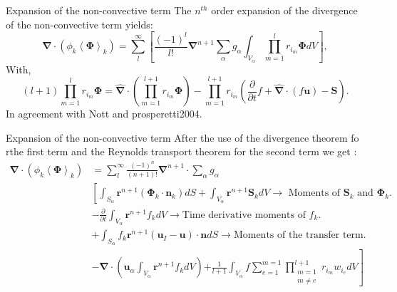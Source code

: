 \documentclass{sintefbeamer}
\newcommand{\kavg}[1]{\left<#1\right>_k}
\newcommand{\nablab}{\bm{\nabla}}
\newcommand{\nablabh}{\hat{\bm{\nabla}}}
\newcommand{\pddt}{\frac{\partial}{\partial t}}
\begin{document}
\begin{frame}  {Expansion of the non-convective term}
  The $n^{th}$ order expansion of the divergence of the non-convective term yields:
  \begin{equation}
    \nablab\cdot
    (\phi_k \kavg{\bm{\Phi}})=
    \sum_l^\infty
    \left[
        \frac{(-1)^{l}}{l!}
        \nablab^{n+1}
        \sum_{\alpha}
        g_{\alpha}
        \int_{V_\alpha}
        \prod^{l}_{m=1}
        r_{i_m} \bm{\Phi}dV
    \right],
\end{equation}
With,
\begin{equation}
    (l+1) \prod^{l}_{m=1} r_{i_m} \bm{\Phi}
    =\nablabh \cdot \left(\prod^{l+1}_{m=1} r_{i_m} \bm{\Phi}\right)
    - \prod^{l+1}_{m=1} r_{i_m} \left(
        \pddt f 
        + \nablabh \cdot (f \textbf{u})
        - \textbf{S}
    \right).
\end{equation}
In agreement with \citet{nott2011suspension}Nott and \citet{prosperetti2004average}prosperetti2004.
\end{frame}

\begin{frame}
  {Expansion of the non-convective term}
  After the use of the divergence theorem fo rthe first term and the Reynolds transport theorem for the second term we get :
  \begin{align*}
    \nablab \cdot
    (\phi_k \kavg{\bm{\Phi}})
    & =\sum_l^\infty
    \frac{(-1)^{n}}{(n+1)!}
    \nablab^{n+1}
    \cdot
    \sum_{\alpha}
    g_{\alpha} \\
  &\left[
    \int_{S_\alpha}
    \textbf{r}^{n+1}
    (\bm{\Phi}_k \cdot \textbf{n}_k) dS
    \right.
      +\int_{V_\alpha}
      \textbf{r}^{n+1}
      \textbf{S}_k dV \rightarrow \text{    Moments of $\textbf{S}_k$ and $\bm{\Phi}_k$.}\\
      &- \pddt
      \int_{V_\alpha}
      \textbf{r}^{n+1}  f_k dV \rightarrow \text{Time derivative moments of $f_k$.}\\
      &
        + \int_{S_\alpha} 
          f_k\textbf{r}^{n+1} 
          \left(\textbf{u}_I - \textbf{u}\right) \cdot \textbf{n}dS
          \rightarrow \text{Moments of the transfer term.}\\
      &- \nablab \cdot\left(
        \textbf{u}_\alpha 
        \int_{V_\alpha}
        \textbf{r}^{n+1}  f_k dV
      \right)
      \left.+\frac{1}{l+1}\int_{V_\alpha}
      f\sum_{e=1}^{m=1} 
      \prod^{l+1}_{\substack{m=1\\ m\neq e}} 
      r_{i_m} 
      w_{i_e}
      dV\right]\\
  \end{align*}
\end{frame}
\end{document}

